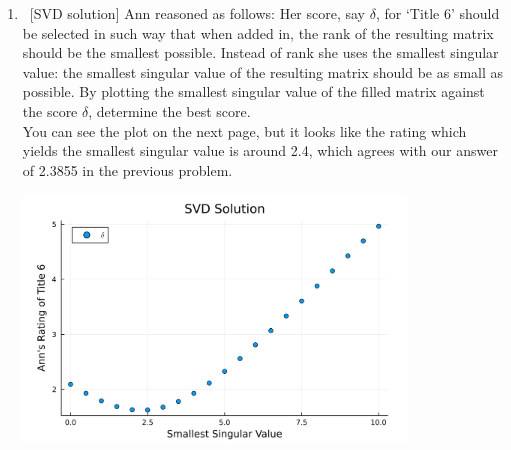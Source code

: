 \documentclass[11pt]{article}
\newcommand{\n}{\vspace{0.3cm}}
\begin{document}
\begin{enumerate}
\begin{enumerate}
		      \item\ [SVD solution] Ann reasoned as follows: Her score, say \(\delta\), for `Title 6' should be selected in such way that when added in, the rank of the resulting matrix should be the smallest possible.  Instead of rank she uses the smallest singular value: the smallest singular value of the resulting matrix should be as small as possible.  By plotting the \color{red} smallest singular value \color{black} of the filled matrix against the score \(\delta\), determine the best score. \n\\
            You can see the plot on the next page, but it looks like the rating which yields the smallest singular value is around 2.4, which agrees with our answer of 2.3855 in the previous problem.
            
            \includegraphics[width=0.8\textwidth]{plot.png}
	      \end{enumerate}


\end{enumerate}
\end{document}
